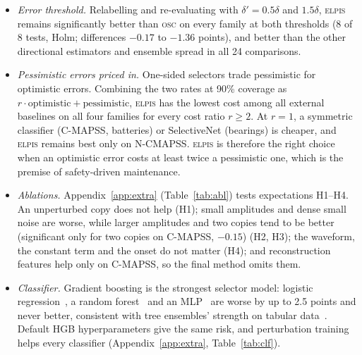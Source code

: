 \documentclass{esannV2}
\newcommand{\OSC}{\textsc{osc}}
\newcommand{\RPT}{\textsc{elpis}}
\begin{document}
\begin{itemize}
\item \emph{Error threshold.} Relabelling and re-evaluating with $\delta'=0.5\delta$ and $1.5\delta$, \RPT{} remains significantly better than \OSC{} on every family at both thresholds (8 of 8 tests, Holm; differences $-0.17$ to $-1.36$ points), and better than the other directional estimators and ensemble spread in all 24 comparisons.
\item \emph{Pessimistic errors priced in.} One-sided selectors trade pessimistic for optimistic errors. Combining the two rates at 90\% coverage as $r\cdot\text{optimistic}+\text{pessimistic}$, \RPT{} has the lowest cost among all external baselines on all four families for every cost ratio $r\ge2$. At $r=1$, a symmetric classifier (C-MAPSS, batteries) or SelectiveNet (bearings) is cheaper, and \RPT{} remains best only on N-CMAPSS. \RPT{} is therefore the right choice when an optimistic error costs at least twice a pessimistic one, which is the premise of safety-driven maintenance.
\item \emph{Ablations}\label{sec:abl}\emph{.} Appendix~\ref{app:extra} (Table~\ref{tab:abl}) tests expectations H1--H4. An unperturbed copy does not help (H1); small amplitudes and dense small noise are worse, while larger amplitudes and two copies tend to be better (significant only for two copies on C-MAPSS, $-0.15$) (H2, H3); the waveform, the constant term and the onset do not matter (H4); and reconstruction features help only on C-MAPSS, so the final method omits them.
\item \emph{Classifier}\label{sec:clf}\emph{.} Gradient boosting is the strongest selector model: logistic regression~\cite{cox1958regression}, a random forest~\cite{breiman2001random} and an MLP~\cite{rumelhart1986learning} are worse by up to 2.5 points and never better, consistent with tree ensembles' strength on tabular data~\cite{grinsztajn2022tree}. Default HGB hyperparameters give the same risk, and perturbation training helps every classifier (Appendix~\ref{app:extra}, Table~\ref{tab:clf}).

\end{itemize}
\end{document}
